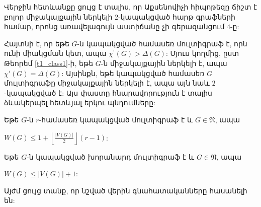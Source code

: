 Վերջին հետևանքը ցույց է տալիս, որ Աքսենովիչի հիպոթեզը ճիշտ է բոլոր միջակայքային ներկելի $2$-կապակցված հարթ գրաֆների համար, որոնց առավելագույն աստիճանը չի գերազանցում $4$-ը:


Հայտնի է, որ եթե $G$-ն կապակցված համասեռ մուլտիգրաֆ է, որն ունի միակցման կետ, ապա $\chi^{\prime}(G)>\Delta(G)$: Մյուս կողմից, ըստ Թեորեմ \ref{t1_class1}-ի, եթե $G$-ն միջակայքային ներկելի է, ապա $\chi'(G) = \Delta(G)$: Այսինքն, եթե կապակցված համասեռ $G$ մուլտիգրաֆը միջակայքային ներկելի է, ապա այն նաև $2$-կապակցված է: Այս փաստը հնարավորություն է տալիս ձևակերպել հետևյալ երկու պնդումները:

\begin{corollary}
\label{c1_upper_V/2_regular} Եթե $G$-ն $r$-համասեռ կապակցված մուլտիգրաֆ է և $G\in \mathfrak{N}$, ապա
\begin{center}
$W(G)\leq 1+\left\lfloor \frac{\vert
V(G)\vert}{2}\right\rfloor(r-1)$:
\end{center}
\end{corollary}

\begin{corollary}
\label{c1_upper_Delta3} Եթե $G$-ն կապակցված խորանարդ մուլտիգրաֆ է և $G\in \mathfrak{N}$, ապա
\begin{center}
$W(G)\leq \vert V(G)\vert+1$:
\end{center}
\end{corollary}

Այժմ ցույց տանք, որ նշված վերին գնահատականները հասանելի են:


